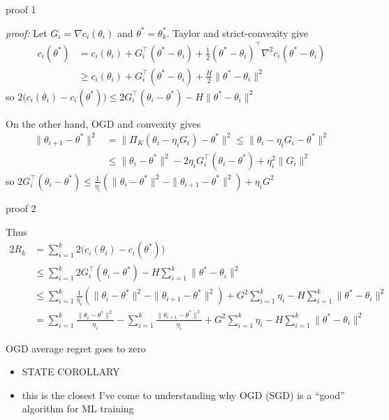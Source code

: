 \documentclass[xcolor={svgnames},
               hyperref={colorlinks,citecolor=DeepPink4,linkcolor=FireBrick,urlcolor=Maroon}]
               {beamer}
\newcommand{\grad}{\nabla}
\newcommand{\ds}{\displaystyle}
\begin{document}
\begin{frame}{proof 1}

\noindent \emph{proof:}  Let $G_i = \grad c_i(\theta_i)$ and $\theta^*=\theta_k^*$.  Taylor and strict-convexity give
\begin{align*}
c_i(\theta^*) &= c_i(\theta_i) + G_i^\top (\theta^* - \theta_i) + \frac{1}{2} (\theta^* - \theta_i)^\top \grad^2 c_i (\theta^* - \theta_i) \\
    &\ge c_i(\theta_i) + G_i^\top (\theta^* - \theta_i) + \frac{H}{2} \|\theta^* - \theta_i\|^2
\end{align*}
so \quad $\ds 2 \big(c_i(\theta_i) - c_i(\theta^*)\big) \le 2 G_i^\top (\theta_i - \theta^*) - H \|\theta^* - \theta_i\|^2$

\medskip
\noindent On the other hand, OGD and convexity gives
\begin{align*}
\|\theta_{i+1} - \theta^*\|^2 &= \|\Pi_K(\theta_i - \eta_i G_i) - \theta^*\|^2 \le \|\theta_i - \eta_i G_i - \theta^*\|^2 \\
    &\le \|\theta_i - \theta^*\|^2 - 2 \eta_i G_i^\top (\theta_i - \theta^*) + \eta_i^2 \|G_i\|^2
\end{align*}
so \quad $\ds 2 G_i^\top (\theta_i - \theta^*) \le \frac{1}{\eta_i} \left(\|\theta_i - \theta^*\|^2 - \|\theta_{i+1} - \theta^*\|^2\right) + \eta_i G^2$
\end{frame}


\begin{frame}{proof 2}

Thus
\begin{align*}
2 R_k &= \sum_{i=1}^k 2 \big(c_i(\theta_i) - c_i(\theta^*)\big) \\
    &\le \sum_{i=1}^k 2 G_i^\top (\theta_i - \theta^*) - H \sum_{i=1}^k \|\theta^* - \theta_i\|^2 \\
    &\le \sum_{i=1}^k \frac{1}{\eta_i} \left(\|\theta_i - \theta^*\|^2 - \|\theta_{i+1} - \theta^*\|^2\right) + G^2 \sum_{i=1}^k \eta_i - H \sum_{i=1}^k \|\theta^* - \theta_i\|^2 \\
    &= \sum_{i=1}^k \frac{\|\theta_i - \theta^*\|^2}{\eta_i} - \sum_{i=1}^k \frac{\|\theta_{i+1} - \theta^*\|^2}{\eta_i} + G^2 \sum_{i=1}^k \eta_i - H \sum_{i=1}^k \|\theta^* - \theta_i\|^2
\end{align*}
\end{frame}


\begin{frame}{OGD average regret goes to zero}

\begin{itemize}
\item STATE COROLLARY
\item this is the closest I've come to understanding why OGD (SGD) is a ``good'' algorithm for ML training
\end{itemize}
\end{frame}
\end{document}
